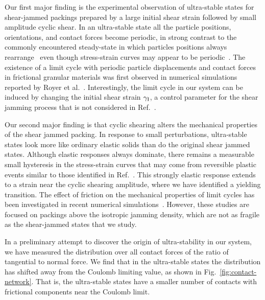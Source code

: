 \documentclass[twocolumn,showkeys,superscriptaddress,preprintnumbers,amsmath,amssymb,showpacs,prx,longbibliography]{revtex4-2}
\begin{document}
\begin{CJK*}{UTF8}{gbsn}
Our first major finding is the 
experimental observation of ultra-stable states for shear-jammed packings prepared by a large initial shear strain 
followed by small amplitude cyclic shear.
In an ultra-stable state all the particle positions, orientations, and contact forces become periodic, in strong contrast to the commonly encountered steady-state in which particles positions always rearrange~\cite{kou2017_nature,sun2020_prl} even though stress-strain curves may appear to be periodic~\cite{Ren2013_prl,leishangthem2017_natcom}. The existence of a limit cycle 
with periodic particle displacements and contact forces in frictional granular materials was first observed in numerical simulations reported by Royer et al.~\cite{Royer2015_pnas}. 
Interestingly, the limit cycle in our system can be induced by changing the initial shear strain $\gamma_{\rm I}$, a control parameter for the shear jamming process that is not considered in Ref.~\cite{Royer2015_pnas}.


Our second major finding is that cyclic shearing alters the mechanical properties of the shear jammed packing. In response to small perturbations, ultra-stable states
look more like ordinary elastic solids than do the original
shear jammed states.
{\color{black} Although elastic responses always dominate, there remains a measurable small hysteresis in the stress-strain curves that may come from reversible plastic events similar to those identified in Ref.~\cite{keim2014_prl}. }
This 
{\color{black} strongly}
elastic response extends to a strain near the cyclic shearing amplitude, where we have identified a yielding transition. The effect of friction on the mechanical properties of  limit cycles has been investigated in recent numerical simulations~\cite{Otsuki2021_epje}. However, these studies are focused on  packings above the isotropic jamming density, which are not as fragile as the shear-jammed states that we study. 


In a preliminary attempt to discover the origin of ultra-stability in our system, 
we have measured the distribution over all contact forces of the ratio of tangential to normal force. We find that in the ultra-stable states the distribution has shifted away from the Coulomb limiting value, as shown in Fig.~\ref{fig:contact-network}. That is, the ultra-stable states have a smaller number of contacts with frictional components near the Coulomb limit.


\end{CJK*}
\end{document}
